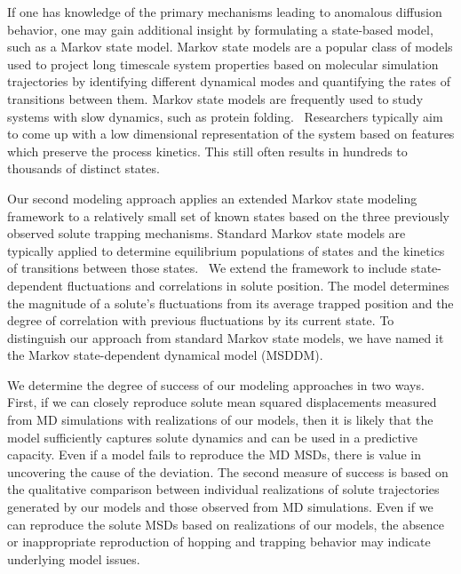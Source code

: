 \documentclass[journal=jctcce,manuscript=article]{achemso}
\begin{document}
  If one has knowledge of the primary mechanisms leading to anomalous diffusion
  behavior, one may gain additional insight by formulating a state-based model,
  such as a Markov state model. Markov state models are a popular class of models
  used to project long timescale system properties based on molecular simulation
  trajectories by identifying different dynamical modes and quantifying the
  rates of transitions between them. Markov state models are frequently used to
  study systems with slow dynamics, such as protein 
  folding.~\cite{snow_how_2005,chodera_automatic_2007} Researchers typically
  aim to come up with a low dimensional representation of the system based on
  features which preserve the process kinetics. This still often results in
  hundreds to thousands of distinct states.~\cite{chodera_markov_2014}

  Our second modeling approach applies an extended Markov state modeling 
  framework to a relatively small set of known states based on the three 
  previously observed solute trapping mechanisms. Standard Markov state models
  are typically applied to determine equilibrium populations of states and 
  the kinetics of transitions between those states.~\cite{bowman_using_2009}
  We extend the framework to include state-dependent fluctuations and 
  correlations in solute position. The model determines the magnitude of a 
  solute's fluctuations from its average trapped position and the degree of 
  correlation with previous fluctuations by its current state. To distinguish 
  our approach from standard Markov state models, we have named it the
  Markov state-dependent dynamical model (MSDDM).
  
  We determine the degree of success of our modeling approaches in two ways.
  First, if we can closely reproduce solute mean squared displacements
  measured from MD simulations with realizations of our models, then it is likely that the model
  sufficiently captures solute dynamics and can be used in a predictive
  capacity. Even if a model fails to reproduce the MD MSDs, there is value in
  uncovering the cause of the deviation. The second measure of success is based
  on the qualitative comparison between individual realizations of solute 
  trajectories generated by our models and those observed from MD simulations. 
  Even if we can reproduce the solute MSDs based on realizations of our models,
  the absence or inappropriate reproduction of hopping and trapping behavior may
  indicate underlying model issues. 
  
\end{document}
